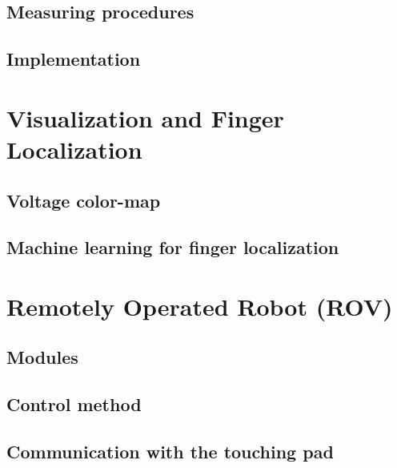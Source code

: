 \documentclass[reprint,amsmath, amsfonts, amssymb, aps, letterpaper]{revtex4-1}
\begin{document}
\subsection{Measuring procedures}
\subsection{Implementation}

\section{Visualization and Finger Localization}
\subsection{Voltage color-map}
\subsection{Machine learning for finger localization}

\section{Remotely Operated Robot (ROV)}
\subsection{Modules}
\subsection{Control method}
\subsection{Communication with the touching pad}

\nocite{*}
\end{document}
